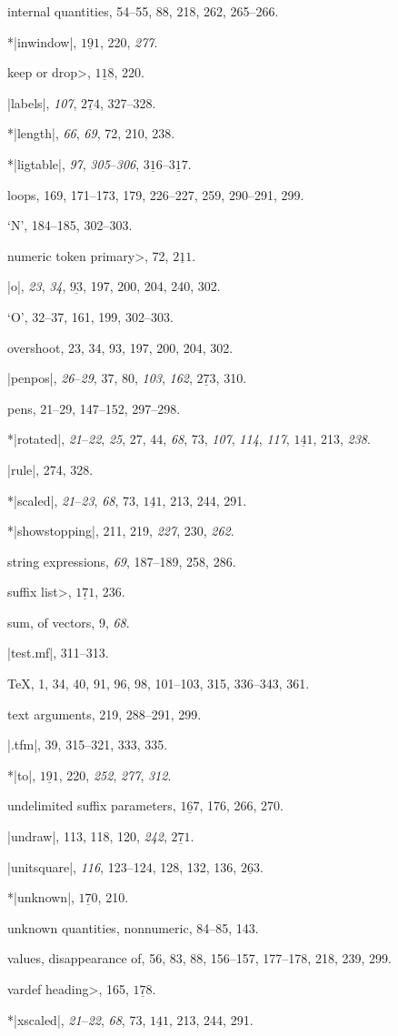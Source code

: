 internal quantities, 54--55, 88, 218, 262, 265--266.\par
*|inwindow|, $\underline{191}$, 220, {\it277}.\par
\<keep or drop>, $\underline{118}$, 220.\par
|labels|, {\it107}, $\underline{274}$, 327--328.\par
*|length|, {\it66}, {\it69}, 72, 210, 238.\par
*|ligtable|, {\it97}, {\it305}--{\it306}, $\underline{316}$--$\underline{317}$.\par
loops, 169, 171--173, 179, 226--227, 259, 290--291, 299.\par
`N', 184--185, 302--303.\par
\<numeric token primary>, 72, $\underline{211}$.\par
|o|, {\it23}, {\it34}, $\underline{93}$, 197, 200, 204, 240, 302.\par
`O', 32--37, 161, 199, 302--303.\par
overshoot, 23, 34, 93, 197, 200, 204, 302.\par
|penpos|, {\it26}--{\it29}, 37, 80, {\it103}, {\it162}, $\underline{273}$, 310.\par
pens, 21--29, 147--152, 297--298.\par
*|rotated|, {\it21}--{\it22}, {\it25}, 27, 44, {\it68}, 73, {\it107}, {\it114}, {\it117}, $\underline{141}$, 213, {\it238}.\par
|rule|, 274, 328.\par
*|scaled|, {\it21}--{\it23}, {\it68}, 73, $\underline{141}$, 213, 244, 291.\par
*|showstopping|, 211, 219, {\it227}, 230, {\it262}.\par
string expressions, {\it69}, 187--189, 258, 286.\par
\<suffix list>, $\underline{171}$, 236.\par
sum, of vectors, 9, {\it68}.\par
|test.mf|, 311--313.\par
\TeX, 1, 34, 40, 91, 96, 98, 101--103, 315, 336--343, 361.\par
text arguments, 219, 288--291, 299.\par
|.tfm|, 39, 315--321, 333, 335.\par
*|to|, $\underline{191}$, 220, {\it252}, {\it277}, {\it312}.\par
undelimited suffix parameters, $\underline{167}$, 176, 266, 270.\par
|undraw|, 113, 118, 120, {\it242}, $\underline{271}$.\par
|unitsquare|, {\it116}, 123--124, 128, 132, 136, $\underline{263}$.\par
*|unknown|, $\underline{170}$, 210.\par
unknown quantities, nonnumeric, 84--85, 143.\par
values, disappearance of, 56, 83, 88, 156--157, 177--178, 218, 239, 299.\par
\<vardef heading>, 165, $\underline{178}$.\par
*|xscaled|, {\it21}--{\it22}, {\it68}, 73, $\underline{141}$, 213, 244, 291.\par



